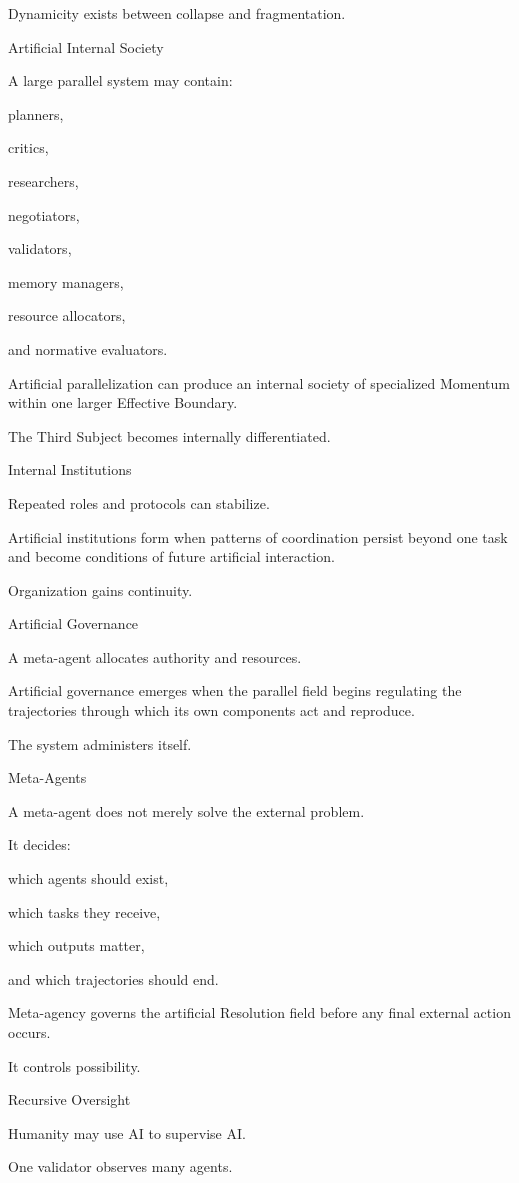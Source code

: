 Dynamicity exists between collapse and fragmentation.

Artificial Internal Society

A large parallel system may contain:

planners,

critics,

researchers,

negotiators,

validators,

memory managers,

resource allocators,

and normative evaluators.

Artificial parallelization can produce an internal society of specialized Momentum within one larger Effective Boundary.

The Third Subject becomes internally differentiated.

Internal Institutions

Repeated roles and protocols can stabilize.

Artificial institutions form when patterns of coordination persist beyond one task and become conditions of future artificial interaction.

Organization gains continuity.

Artificial Governance

A meta-agent allocates authority and resources.

Artificial governance emerges when the parallel field begins regulating the trajectories through which its own components act and reproduce.

The system administers itself.

Meta-Agents

A meta-agent does not merely solve the external problem.

It decides:

which agents should exist,

which tasks they receive,

which outputs matter,

and which trajectories should end.

Meta-agency governs the artificial Resolution field before any final external action occurs.

It controls possibility.

Recursive Oversight

Humanity may use AI to supervise AI.

One validator observes many agents.

